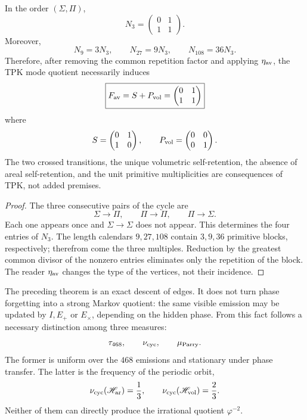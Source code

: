 \begin{theorem}
\label{p12-83-c16-s3:thm:descenso-necesario-fav-corta}
In the order \((\Sigma,\Pi)\),
\[
 N_3=
 \begin{pmatrix}0&1\\1&1\end{pmatrix}.
\]
Moreover,
\[
 N_9=3N_3,\qquad
 N_{27}=9N_3,\qquad
 N_{108}=36N_3.
\]
Therefore, after removing the common repetition factor and applying
\(\eta_{\rm av}\), the TPK mode quotient necessarily induces
\[
 \boxed{
 F_{\rm av}=S+P_{\rm vol}
 =
 \begin{pmatrix}0&1\\1&1\end{pmatrix}
 }
\]
where
\[
 S=\begin{pmatrix}0&1\\1&0\end{pmatrix},
 \qquad
 P_{\rm vol}=\begin{pmatrix}0&0\\0&1\end{pmatrix}.
\]
The two crossed transitions, the unique volumetric self-retention, the
absence of areal self-retention, and the unit primitive multiplicities
are consequences of TPK, not added premises.
\end{theorem}

\begin{proof}
The three consecutive pairs of the cycle are
\[
 \Sigma\longrightarrow\Pi,\qquad
 \Pi\longrightarrow\Pi,\qquad
 \Pi\longrightarrow\Sigma.
\]
Each one appears once and \(\Sigma\to\Sigma\) does not appear. This determines
the four entries of \(N_3\). The length calendars
\(9,27,108\) contain \(3,9,36\) primitive blocks, respectively;
therefrom come the three multiples. Reduction by the greatest common divisor of the
nonzero entries eliminates only the repetition of the block. The reader
\(\eta_{\rm av}\) changes the type of the vertices, not their incidence.
\end{proof}

The preceding theorem is an exact descent of edges. It does not turn phase
forgetting into a strong Markov quotient: the same visible emission may
be updated by \(I,E_+\) or \(E_\times\), depending on the hidden phase. From
this fact follows a necessary distinction among three measures:
\[
 \tau_{468},\qquad
 \nu_{\rm cyc},\qquad
 \mu_{\rm Parry}.
\]
The former is uniform over the \(468\) emissions and stationary under
phase transfer. The latter is the frequency of the periodic orbit,
\[
 \nu_{\rm cyc}(\mathscr H_{\rm ar})=\frac13,\qquad
 \nu_{\rm cyc}(\mathscr H_{\rm vol})=\frac23.
\]
Neither of them can directly produce the irrational quotient
\(\varphi^{-2}\).

